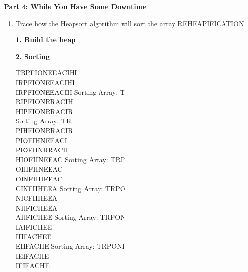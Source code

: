 \documentclass{article}
\begin{document}
\begin{center}
\textbf{Part 4: While You Have Some Downtime}
\end{center}
\begin{enumerate}
\item Trace how the Heapsort algorithm will sort the array REHEAPIFICATION
\begin{center}
\textbf{1. Build the heap}
\end{center}
\begin{center}
\textbf{2. Sorting}
\end{center}
TRPFIONEEACIHI\\
IRPFIONEEACIHI\\
IRPFIONEEACIH Sorting Array: T\\
RIPFIONRRACIH\\
HIPFIONRRACIR\\ Sorting Array: TR\\
PIHFIONRRACIR\\
PIOFIHNEEACI\\
PIOFIINRRACH\\
HIOFIINEEAC Sorting Array: TRP\\
OIHFIINEEAC\\
OINFIIHEEAC\\
CINFIIHEEA Sorting Array: TRPO \\
NICFIIHEEA \\
NIIFICHEEA\\
AIIFICHEE Sorting Array: TRPON\\
IAIFICHEE \\
IIIFACHEE\\
EIIFACHE Sorting Array: TRPONI\\
IEIFACHE \\
IFIEACHE \\

\end{enumerate}
\end{document}
